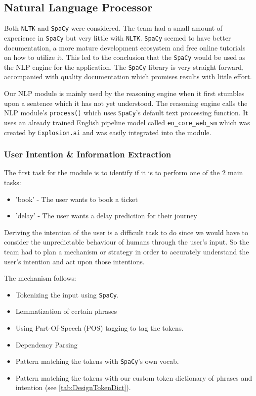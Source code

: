 \documentclass[11pt]{article}
\newcommand{\code}[1]{{\texttt{#1}}}
\begin{document}
    \subsection{Natural Language Processor}\label{sec:NLPDesign}
    Both \code{NLTK} and \code{SpaCy} were considered. The team had a small amount of experience in \code{SpaCy} but very little with \code{NLTK}. \code{SpaCy} seemed to have better documentation, a more mature development ecosystem and free online tutorials on how to utilize it. This led to the conclusion that the \code{SpaCy} would be used as the NLP engine for the application. The \code{SpaCy} library is very straight forward, accompanied with quality documentation which promises results with little effort.
    
    
    Our NLP module is mainly used by the reasoning engine when it first stumbles upon a sentence which it has not yet understood. The reasoning engine calls the NLP module's \code{process()} which uses \code{SpaCy}'s default text processing function. It uses an already trained English pipeline model called \code{en\_core\_web\_sm} which was created by \code{Explosion.ai} and was easily integrated into the module. 
    
        \subsubsection{User Intention \& Information Extraction}
        The first task for the module is to identify if it is to perform one of the 2 main tasks:
    
        \begin{itemize}
            \item 'book' - The user wants to book a ticket
            \item 'delay' - The user wants a delay prediction for their journey
        \end{itemize}
    
        
        Deriving the intention of the user is a difficult task to do since we would have to consider the unpredictable behaviour of humans through the user's input. So the team had to plan a mechanism or strategy in order to accurately understand the user's intention and act upon those intentions.
        
        The mechanism follows:
        \begin{itemize}
            \item Tokenizing the input using \code{SpaCy}.
            \item Lemmatization of certain phrases
            \item Using Part-Of-Speech (POS) tagging to tag the tokens.
            \item Dependency Parsing 
            \item Pattern matching the tokens with \code{SpaCy}'s own vocab.
            \item Pattern matching the tokens with our custom token dictionary of phrases and intention (see \cref{tab:DesignTokenDict}).
        \end{itemize}
        
\end{document}
